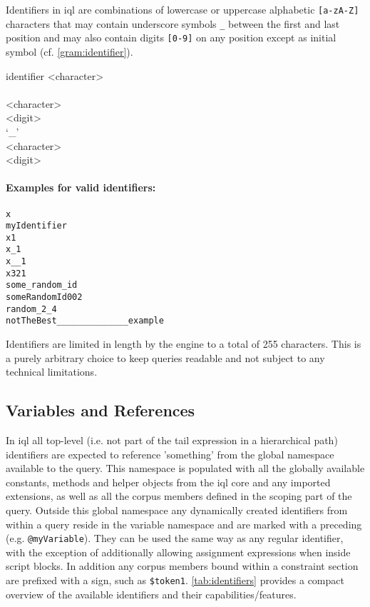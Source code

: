 \documentclass[11pt,a4paper]{article}
\begin{document}
\noindent Identifiers in \ac{iql} are combinations of lowercase or uppercase alphabetic \texttt{[a-zA-Z]} characters that may contain underscore symbols \texttt{\_} between the first and last position and may also contain digits \texttt{[0-9]} on any position except as initial symbol (cf. \cref{gram:identifier}).

\begin{gram}
	\label{gram:identifier}
	\begin{rrdiag*}{identifier}
		<character> \sst \\ 
			\sst \\ \srp \sst <character> \\ <digit> \\ `\_' \est \\ \erp \est
				 \\ <digit> \est
		\est
	\end{rrdiag*}
\end{gram}

\paragraph{Examples for valid identifiers:}

\begin{Verbatim}[samepage=true]
x
myIdentifier
x1
x_1
x__1
x321
some_random_id
someRandomId002
random_2_4
notTheBest______________example
\end{Verbatim}

\noindent Identifiers are limited in length by the engine to a total of 255 characters. This is a purely arbitrary choice to keep queries readable and not subject to any technical limitations.

\subsection{Variables and References}
\label{sec:variables-references}

In \ac{iql} all top-level (i.e. not part of the tail expression in a hierarchical path) identifiers are expected to reference 'something' from the global namespace available to the query. This namespace is populated with all the globally available constants, methods and helper objects from the \ac{iql} core and any imported extensions, as well as all the corpus members defined in the scoping part of the query. Outside this global namespace any dynamically created identifiers from within a query reside in the variable namespace and are marked with a preceding  (e.g. \texttt{@myVariable}). They can be used the same way as any regular identifier, with the exception of additionally allowing assignment expressions when inside script blocks. In addition any corpus members bound within a constraint section are prefixed with a \lit{\$} sign, such as \texttt{\$token1}. \cref{tab:identifiers} provides a compact overview of the available identifiers and their capabilities/features.
\end{document}
